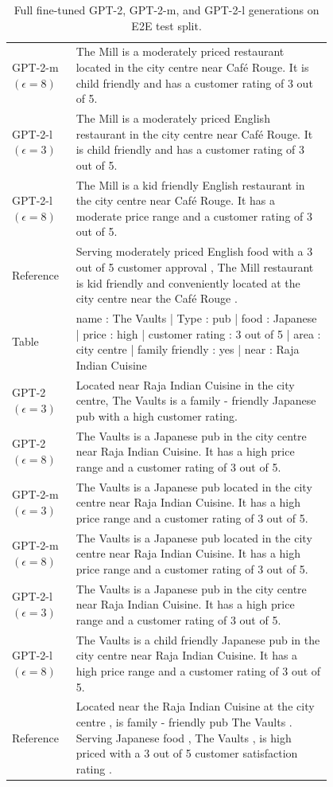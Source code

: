 \begin{table}[h]
\begin{tabular}{l | p{0.8\linewidth}}
GPT-2-m $(\epsilon=8)$ & The Mill is a moderately priced restaurant located in the city centre near Café Rouge. It is child friendly and has a customer rating of 3 out of 5. \\
GPT-2-l $(\epsilon=3)$ & The Mill is a moderately priced English restaurant in the city centre near Café Rouge. It is child friendly and has a customer rating of 3 out of 5. \\
GPT-2-l $(\epsilon=8)$ & The Mill is a kid friendly English restaurant in the city centre near Café Rouge. It has a moderate price range and a customer rating of 3 out of 5. \\
\hline
 Reference & Serving moderately priced English food with a 3 out of 5 customer approval , The Mill restaurant is kid friendly and conveniently located at the city centre near the Café Rouge . \\
\midrule\midrule
Table & name : The Vaults | Type : pub | food : Japanese | price : high | customer rating : 3 out of 5 | area : city centre | family friendly : yes | near : Raja Indian Cuisine  \\
 \hline
GPT-2 $(\epsilon=3)$ & Located near Raja Indian Cuisine in the city centre, The Vaults is a family - friendly Japanese pub with a high customer rating. \\
GPT-2 $(\epsilon=8)$ & The Vaults is a Japanese pub in the city centre near Raja Indian Cuisine. It has a high price range and a customer rating of 3 out of 5. \\
GPT-2-m $(\epsilon=3)$ & The Vaults is a Japanese pub located in the city centre near Raja Indian Cuisine. It has a high price range and a customer rating of 3 out of 5. \\
GPT-2-m $(\epsilon=8)$ & The Vaults is a Japanese pub located in the city centre near Raja Indian Cuisine. It has a high price range and a customer rating of 3 out of 5. \\
GPT-2-l $(\epsilon=3)$ & The Vaults is a Japanese pub in the city centre near Raja Indian Cuisine. It has a high price range and a customer rating of 3 out of 5. \\
GPT-2-l $(\epsilon=8)$ & The Vaults is a child friendly Japanese pub in the city centre near Raja Indian Cuisine. It has a high price range and a customer rating of 3 out of 5. \\
\hline
 Reference & Located near the Raja Indian Cuisine at the city centre , is family - friendly pub The Vaults . Serving Japanese food , The Vaults , is high priced with a 3 out of 5 customer satisfaction rating . \\
\bottomrule
\end{tabular}
\vspace{-2mm}
\caption{\small Full fine-tuned GPT-2, GPT-2-m, and GPT-2-l generations on E2E test split.}
\end{table}


